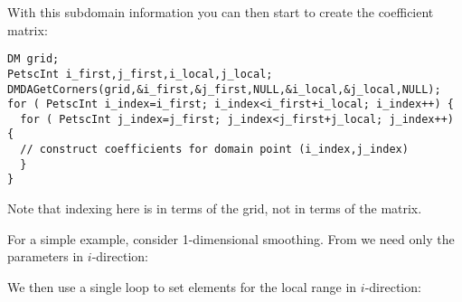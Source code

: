 With this subdomain information you can then start to create the coefficient matrix:
\begin{lstlisting}
DM grid;
PetscInt i_first,j_first,i_local,j_local;
DMDAGetCorners(grid,&i_first,&j_first,NULL,&i_local,&j_local,NULL);
for ( PetscInt i_index=i_first; i_index<i_first+i_local; i_index++) {
  for ( PetscInt j_index=j_first; j_index<j_first+j_local; j_index++) {
  // construct coefficients for domain point (i_index,j_index)
  }
}
\end{lstlisting}
Note that indexing here is in terms of the grid, not in terms of the matrix.

For a simple example, consider 1-dimensional smoothing.
From  we need only the parameters in $i$-direction:
%

We then use a single loop to set elements for the local range in $i$-direction:
%

